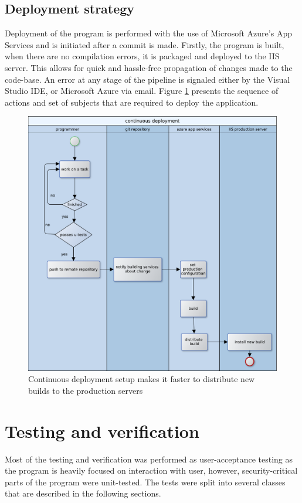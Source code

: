 \documentclass[12pt, twoside, openany]{report}
\theoremstyle{definition}
\begin{document}
\section{Deployment strategy}
Deployment of the program is performed with the use of Microsoft Azure's App Services and is initiated after a commit is made. Firstly, the program is built, when there are no compilation errors, it is packaged and deployed to the IIS server. This allows for quick and hassle-free propagation of changes made to the code-base. An error at any stage of the pipeline is signaled either by the Visual Studio IDE, or Microsoft Azure via email.
Figure \ref{fig:continuous-deployment} presents the sequence of actions and set of subjects that are required to deploy the application.
\begin{figure}
	\centering
	\includegraphics[width=\linewidth]{continuous-deployment}
	\caption{Continuous deployment setup makes it faster to distribute new builds to the production servers
		\label{fig:continuous-deployment}
	}
\end{figure}

\chapter{Testing and verification}
Most of the testing and verification was performed as user-acceptance testing as the program is heavily focused on interaction with user, however, security-critical parts of the program were unit-tested.
The tests were split into several classes that are described in the following sections. 
\end{document}
